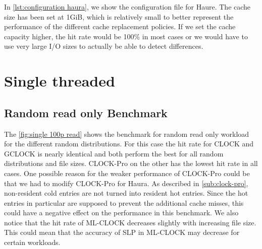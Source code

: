 \documentclass[
	12pt,
	a4paper,
	abstract,
	bibliography=totoc,
	chapterprefix,
	headings=openright,
	numbers=endperiod,
	parskip=half,
	twoside,
]{scrreprt}
\begin{document}
In \ref{lst:configuration haura}, we show the configuration file for Haure.
The cache size has been set at 1GiB, which is relatively small to better 
represent the performance of the different cache replacement policies.
If we set the cache capacity higher, the hit rate would be 100\% 
in most cases or we would have to use very large I/O sizes to actually be able to detect differences.


\newpage
\section{Single threaded}
\subsection{Random read only Benchmark}

The \cref{fig:single 100p read} shows the benchmark for random read only workload for the different random distributions.
For this case the hit rate for CLOCK and GCLOCK is nearly identical and both perform the best for all random distributions and file sizes. 
CLOCK-Pro on the other has the lowest hit rate in all cases.
One possible reason for the weaker performance of CLOCK-Pro could be that we had to modify CLOCK-Pro for Haura.
As described in \ref{sub:clock-pro}, non-resident cold entries are not turned into resident hot entries.
Since the hot entries in particular are supposed to prevent the additional cache misses, 
this could have a negative effect on the performance in this benchmark.
We also notice that the hit rate of ML-CLOCK decreases slightly with increasing file size.
This could mean that the accuracy of SLP in ML-CLOCK may decrease for certain workloads.
\end{document}
